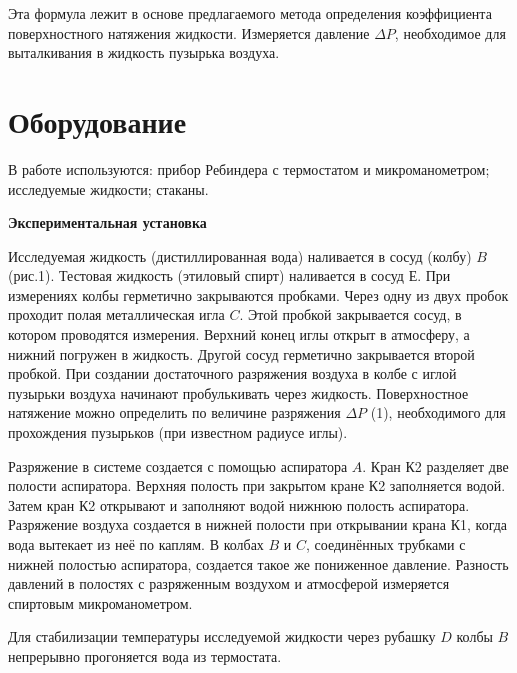 \documentclass[a4paper,12pt]{article}
\theoremstyle{plain} %
\theoremstyle{definition} %
\theoremstyle{remark} %
\begin{document}
	Эта формула лежит в основе предлагаемого метода определения коэффициента поверхностного натяжения жидкости. Измеряется давление $\Delta P$, необходимое для выталкивания в жидкость пузырька воздуха.
	\section{Оборудование}
	В работе используются:  прибор  Ребиндера  с термостатом и микроманометром; исследуемые жидкости; стаканы.
	
	\noindent\textbf{Экспериментальная установка}
	
	Исследуемая жидкость (дистиллированная вода) наливается в сосуд (колбу) $B$ (рис.1). Тестовая жидкость  (этиловый спирт) наливается  в сосуд $Е$.  При измерениях  колбы герметично закрываются  пробками.   Через одну из двух пробок  проходит полая металлическая игла $C$. Этой пробкой закрывается сосуд, в котором  проводятся измерения. Верхний конец иглы открыт в атмосферу, а нижний погружен в жидкость. Другой сосуд герметично закрывается второй пробкой. При создании достаточного  разряжения воздуха в колбе с иглой пузырьки воздуха начинают пробулькивать через жидкость. Поверхностное натяжение можно определить по величине разряжения $\Delta P$ (1), необходимого для прохождения пузырьков (при известном радиусе иглы).
	
	Разряжение в системе создается с помощью аспиратора $A$. Кран К2 разделяет две полости аспиратора. Верхняя полость при закрытом кране К2  заполняется водой. Затем кран К2 открывают и заполняют водой  нижнюю полость  аспиратора.  Разряжение воздуха создается в нижней полости  при открывании крана К1, когда  вода вытекает из неё по каплям. В колбах $B$ и $C$, соединённых трубками с нижней полостью аспиратора,  создается такое же пониженное давление. Разность давлений в полостях с разряженным воздухом и атмосферой измеряется спиртовым микроманометром. 
	
	Для стабилизации температуры исследуемой жидкости через рубашку $D$ колбы $B$ непрерывно прогоняется вода из термостата.
	
\end{document}
